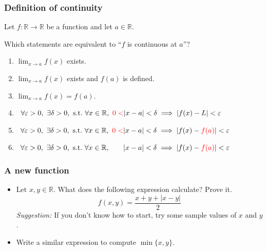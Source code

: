 \documentclass[14pt]{beamer}
\newcommand {\DS} [1] {${\displaystyle #1}$}
\newcommand {\R}{\mathbb{R}}
\newcommand{\p}{\pause}
\newcommand{\rojo}[1]{{\color{red} #1}}
\newcommand{\setsize}[1]{\fontsize{#1}{#1}\selectfont} %
\newcommand{\smallerfont}{\setsize{13}} %
\begin{document}
\begin{frame}[t]
	\frametitle{Definition of continuity}
	Let $f:\mathbb R\to\mathbb R$ be a function and let $a\in\mathbb R$.

	\bigskip
	\smallerfont
	Which statements are equivalent to ``$f$ is continuous at $a$''?

	\bigskip
	\begin{enumerate}
		\item \DS{\lim_{x\to a} f(x)} exists.
			\vfill
		\item \DS{\lim_{x\to a} f(x)} exists and $f(a)$ is defined.
			\vfill
		\item \DS{\lim_{x\to a} f(x)=f(a)}.

		
			\vfill
		\item \mbox{
			\footnotesize
			$\forall \varepsilon>0,\ \exists\delta >0,\ \text{s.t.}\ \forall x\in\mathbb R,\ \rojo{0<}|x-a|<\delta\implies |f(x)-L|<\varepsilon$
		}
			\vfill
		\item \mbox{
			\footnotesize
			$\forall \varepsilon>0,\ \exists\delta >0,\ \text{s.t.}\ \forall x\in\mathbb R,\ \rojo{0<}|x-a|<\delta\implies |f(x)-\rojo{f(a)}|<\varepsilon$
		}
			\vfill
		\item \mbox{
			\footnotesize
			$\forall \varepsilon>0,\ \exists\delta >0,\ \text{s.t.}\ \forall x\in\mathbb R,\ \phantom{0<}|x-a|<\delta\implies |f(x)-\rojo{f(a)}|<\varepsilon$
		}
	\end{enumerate}
			\vfill
	
\end{frame}

\begin{frame}
\frametitle{A new function}

\begin{itemize}
\item Let $x, y \in \R$.  What does the following expression calculate?  Prove it.
	$$
		f(x,y) = \frac{x + y + |x - y|}{2}
	$$
\emph{Suggestion:}  If you don't know how to start, try some sample values of $x$ and $y$.
\vfill  \p

\item Write a similar expression to compute \DS{\min \{ x, y \}}.
\end{itemize}
\vfill

\end{frame}
\end{document}
